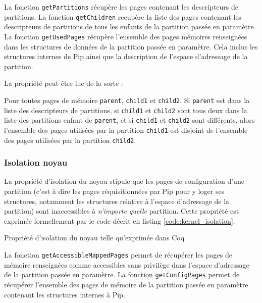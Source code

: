 			La fonction \texttt{getPartitions} récupère les pages contenant les descripteurs de partitions. La fonction \texttt{getChildren} recupère la liste des pages contenant les descripteurs de partitions de tous les enfants de la partition passée en paramètre. La fonction \texttt{getUsedPages} récupère l'ensemble des pages mémoires renseignées dans les structures de données de la partition passée en paramètre. Cela inclus les structures internes de Pip ainsi que la description de l'espace d'adressage de la partition.

			La propriété peut être lue de la sorte :
			\begin{property}
				Pour toutes pages de mémoire \texttt{parent}, \texttt{child1} et \texttt{child2}. Si \texttt{parent} est dans la liste des descripteurs de partitions, si \texttt{child1} et \texttt{child2} sont tous deux dans la liste des partitions enfant de \texttt{parent}, et si \texttt{child1} et \texttt{child2} sont différents, alors l'ensemble des pages utilisées par la partition \texttt{child1} est disjoint de l'ensemble des pages utilisées par la partition \texttt{child2}.
			\end{property}

			\subsubsection{Isolation noyau}
			\label{sec:kernel_isolation}

			La propriété d'isolation du noyau stipule que les pages de configuration d'une partition (c'est à dire les pages réquisitionnées par Pip pour y loger ses structures, notamment les structures relative à l'espace d'adressage de la partition) sont inaccessibles à \emph{n'importe quelle} partition.
			Cette propriété est exprimée formellement par le code décrit en listing \ref{code:kernel_isolation}.

			\begin{listing}[!ht]
				\caption{Propriété d'isolation du noyau telle qu'exprimée dans Coq}
				\label{code:kernel_isolation}
			\end{listing}

			La fonction \texttt{getAccessibleMappedPages} permet de récupérer les pages de mémoire renseignées comme accessibles sans privilège dans l'espace d'adressage de la partition passée en paramètre. La fonction \texttt{getConfigPages} permet de récupérer l'ensemble des pages de mémoire de la partition passée en paramètre contenant les structures internes à Pip.

